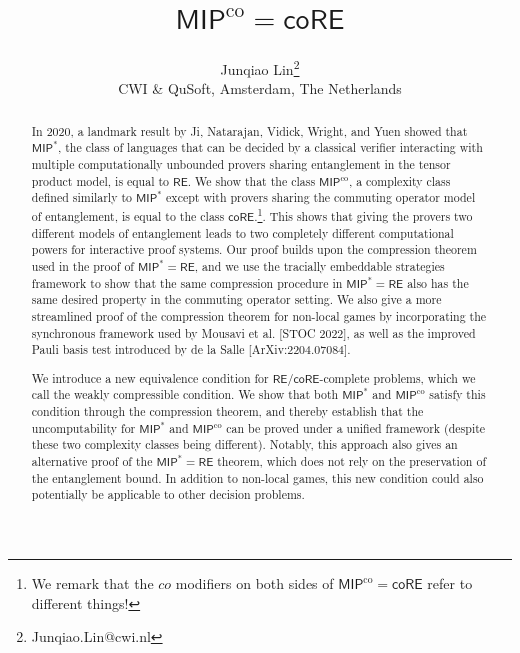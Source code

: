 \documentclass[11pt]{article}
\theoremstyle{definition}
\newcommand{\class}[1]{\ensuremath{\mathsf{#1}}\xspace}
\newcommand{\MIP}{\class{MIP}}
\newcommand{\coclass}{\mathrm{co}}
\newcommand{\MIPco}{\class{MIP}^{\coclass}}
\newcommand{\RE}{\class{RE}}
\newcommand{\coRE}{\class{coRE}}
\begin{document}
\title{$\MIPco=\coRE$ }

\author{
Junqiao Lin\thanks{Junqiao.Lin@cwi.nl} \\ CWI \& QuSoft, Amsterdam, The Netherlands
}



\clearpage\maketitle
\thispagestyle{empty}


\begin{abstract}
In 2020, a landmark result by Ji, Natarajan, Vidick, Wright, and Yuen showed that $\MIP^*$, the class of languages that can be decided by a classical verifier interacting with multiple computationally unbounded provers sharing entanglement in the tensor product model, is equal to $\RE$. We show that the class $\MIPco$, a complexity class defined similarly to $\MIP^*$ except with provers sharing the commuting operator model of entanglement, is equal to the class $\coRE$.\footnote{We remark that the ${co}$ modifiers on both sides of $\MIPco=\coRE$ refer to different things!}. This shows that giving the provers two different models of entanglement leads to two completely different computational powers for interactive proof systems. Our proof builds upon the compression theorem used in the proof of $\MIP^*=\RE$, and we use the tracially embeddable strategies framework to show that the same compression procedure in $\MIP^* =\RE$ also has the same desired property in the commuting operator setting. We also give a more streamlined proof of the compression theorem for non-local games by incorporating the synchronous framework used by Mousavi et al. [STOC 2022], as well as the improved Pauli basis test introduced by de la Salle [ArXiv:2204.07084]. 

We introduce a new equivalence condition for $\RE$/$\coRE$-complete problems, which we call the weakly compressible condition. We show that both $\MIP^*$ and $\MIPco$ satisfy this condition through the compression theorem, and thereby establish that the uncomputability for $\MIP^*$ and $\MIPco$ can be proved under a unified framework (despite these two complexity classes being different). Notably, this approach also gives an alternative proof of the $\MIP^*=\RE$ theorem, which does not rely on the preservation of the entanglement bound. In addition to non-local games, this new condition could also potentially be applicable to other decision problems. 
\end{abstract}
\end{document}
